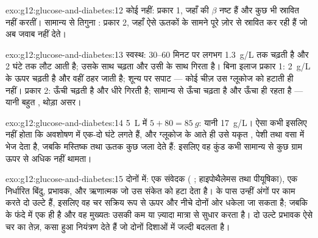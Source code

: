 \begin{solution}{exo:g12:glucose-and-diabetes:12}
कोई  नहीं: प्रकार 1, जहाँ  की $\beta$  नष्ट हैं और
कुछ भी स्रावित नहीं करतीं। सामान्य से तिगुना : प्रकार 2, जहाँ
 ऐसे ऊतकों के सामने पूरे ज़ोर से स्रावित कर रही हैं जो अब जवाब
नहीं देते।
\end{solution}

\begin{solution}{exo:g12:glucose-and-diabetes:13}
स्वस्थ:  30--60 मिनट पर लगभग \qty{1.3}{g/L} तक चढ़ती है और 2
घंटे तक लौट आती है;  उसके साथ चढ़ता और उसी के साथ गिरता है। बिना इलाज
प्रकार 1:  \qty{2}{g/L} के ऊपर चढ़ती है और वहीं ठहर जाती है;
 शून्य पर सपाट --- कोई चीज़ उस ग्लूकोज को हटाती ही नहीं। प्रकार 2:
 ऊँची चढ़ती है और धीरे गिरती है;  सामान्य से ऊँचा चढ़ता
है और ऊँचा ही रहता है --- यानी बहुत , थोड़ा असर।
\end{solution}

\begin{solution}{exo:g12:glucose-and-diabetes:14}
\qty{5}{L} में $5 + 80 = \qty{85}{g}$: यानी \qty{17}{g/L}। ऐसा कभी इसलिए
नहीं होता कि अवशोषण में एक-दो घंटे लगते हैं, और ग्लूकोज के आते ही 
उसे यकृत , पेशी  तथा वसा में भेज देता है, जबकि मस्तिष्क
तथा ऊतक कुछ जला देते हैं: इसलिए वह कुंड कभी सामान्य से कुछ ग्राम ऊपर से
अधिक नहीं थामता।
\end{solution}

\begin{solution}{exo:g12:glucose-and-diabetes:15}
दोनों में: एक संवेदक ( ; हाइपोथैलेमस तथा पीयूषिका), एक
निर्धारित बिंदु, प्रभावक, और ऋणात्मक  जो उस संकेत को हटा देता है।
 के पास उन्हीं अंगों पर काम करते दो उल्टे  हैं, इसलिए वह
चर सक्रिय रूप से ऊपर और नीचे दोनों ओर धकेला जा सकता है; जबकि 
के फंदे में एक ही  है और वह मुख्यतः उसकी कम या ज़्यादा मात्रा से
सुधार करता है। दो उल्टे प्रभावक ऐसे चर का तेज़, कसा हुआ नियंत्रण देते हैं जो
दोनों दिशाओं में जल्दी बदलता है।
\end{solution}

